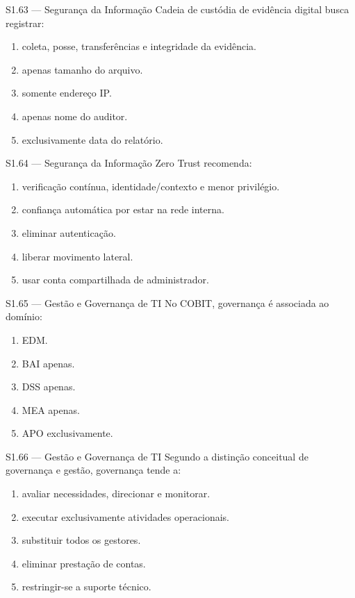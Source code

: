 \begin{questao}{S1.63 — Segurança da Informação}
Cadeia de custódia de evidência digital busca registrar:
\begin{enumerate}[label=\Alph*)]\item coleta, posse, transferências e integridade da evidência.\item apenas tamanho do arquivo.\item somente endereço IP.\item apenas nome do auditor.\item exclusivamente data do relatório.\end{enumerate}
\end{questao}

\begin{questao}{S1.64 — Segurança da Informação}
Zero Trust recomenda:
\begin{enumerate}[label=\Alph*)]\item verificação contínua, identidade/contexto e menor privilégio.\item confiança automática por estar na rede interna.\item eliminar autenticação.\item liberar movimento lateral.\item usar conta compartilhada de administrador.\end{enumerate}
\end{questao}

\begin{questao}{S1.65 — Gestão e Governança de TI}
No COBIT, governança é associada ao domínio:
\begin{enumerate}[label=\Alph*)]\item EDM.\item BAI apenas.\item DSS apenas.\item MEA apenas.\item APO exclusivamente.\end{enumerate}
\end{questao}

\begin{questao}{S1.66 — Gestão e Governança de TI}
Segundo a distinção conceitual de governança e gestão, governança tende a:
\begin{enumerate}[label=\Alph*)]\item avaliar necessidades, direcionar e monitorar.\item executar exclusivamente atividades operacionais.\item substituir todos os gestores.\item eliminar prestação de contas.\item restringir-se a suporte técnico.\end{enumerate}
\end{questao}

